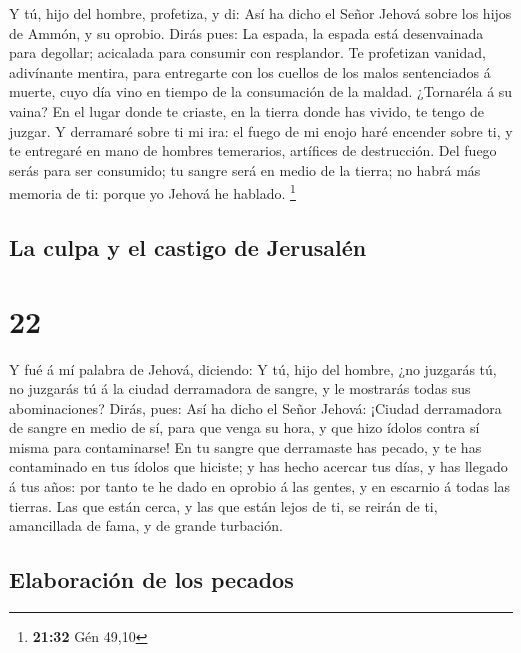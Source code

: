  Y tú, hijo del hombre, profetiza, y di: Así ha dicho el
Señor Jehová sobre los hijos de Ammón, y su oprobio. Dirás pues: La
espada, la espada está desenvainada para degollar; acicalada para
consumir con resplandor.  Te profetizan vanidad, adivínante
mentira, para entregarte con los cuellos de los malos sentenciados á
muerte, cuyo día vino en tiempo de la consumación de la maldad.
 ¿Tornaréla á su vaina? En el lugar donde te criaste, en la
tierra donde has vivido, te tengo de juzgar.  Y derramaré
sobre ti mi ira: el fuego de mi enojo haré encender sobre ti, y te
entregaré en mano de hombres temerarios, artífices de destrucción.
 Del fuego serás para ser consumido; tu sangre será en
medio de la tierra; no habrá más memoria de ti: porque yo Jehová he
hablado. \footnote{\textbf{21:32} Gén 49,10}

\hypertarget{la-culpa-y-el-castigo-de-jerusaluxe9n}{%
\subsection{La culpa y el castigo de
Jerusalén}\label{la-culpa-y-el-castigo-de-jerusaluxe9n}}

\hypertarget{section-21}{%
\section{22}\label{section-21}}

 Y fué á mí palabra de Jehová, diciendo:  Y tú,
hijo del hombre, ¿no juzgarás tú, no juzgarás tú á la ciudad derramadora
de sangre, y le mostrarás todas sus abominaciones?  Dirás,
pues: Así ha dicho el Señor Jehová: ¡Ciudad derramadora de sangre en
medio de sí, para que venga su hora, y que hizo ídolos contra sí misma
para contaminarse!  En tu sangre que derramaste has pecado,
y te has contaminado en tus ídolos que hiciste; y has hecho acercar tus
días, y has llegado á tus años: por tanto te he dado en oprobio á las
gentes, y en escarnio á todas las tierras.  Las que están
cerca, y las que están lejos de ti, se reirán de ti, amancillada de
fama, y de grande turbación.

\hypertarget{elaboraciuxf3n-de-los-pecados}{%
\subsection{Elaboración de los
pecados}\label{elaboraciuxf3n-de-los-pecados}}

